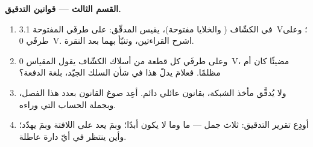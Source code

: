 \begin{problem}
\medskip\noindent\textbf{القسم الثالث --- قوانين التدقيق.}
\begin{enumerate}[resume]
  \item في الكشّاف ( والخلايا  
        مفتوحة)، يقيس المدقّق: على طرفَي  المفتوحة
        \qty{3.1}{V}؛ وعلى طرفَي  \qty{0}{V}. اشرح
        القراءتين، وتنبّأ بهما بعد النقرة.
  \item وعلى طرفَي كل قطعة من أسلاك الكشّاف يقول المقياس
        \qty{0}{V}، مضيئًا كان أم مظلمًا. فعلامَ يدلّ هذا في
        شأن السلك الجيّد، بلغة الدفعة؟
  \item ولا يُدقَّق مأخذ الشبكة، بقانون عائلي دائم. أعِد صوغ
        القانون بعدد هذا الفصل، وبجملة الحساب التي وراءه.
  \item أودِع تقرير التدقيق: ثلاث جمل --- ما  وما
        لا يكون أبدًا؛ وبمَ يعد  على اللافتة
        وبمَ يهدّد؛ وأين ينتظر  في أيّ دارة عاطلة.
\end{enumerate}
\end{problem}
